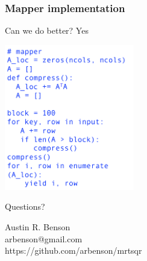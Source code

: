 \documentclass{beamer}
\begin{document}
\begin{frame}
\frametitle{Mapper implementation}

Can we do better? Yes

\begin{center}
\includegraphics[height=2.5in]{./images/chol_map2.png}
\end{center}

\end{frame}


\begin{frame}

\begin{center}
Questions?
\end{center}

\begin{center}
\huge{Austin R. Benson \\
arbenson@gmail.com \\
https://github.com/arbenson/mrtsqr}
\end{center}


\end{frame}
\end{document}
